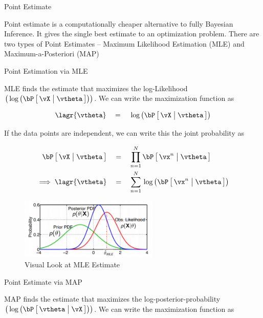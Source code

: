 \documentclass{article}
\begin{document}
\makeheader

\begin{ssection}{Point Estimate}

	Point estimate is a computationally cheaper alternative to fully Bayesian Inference. It gives the single best estimate to an optimization problem. There are two types of Point Estimates -- Maximum Likelihood Estimation (MLE) and Maximum-a-Posteriori (MAP)

	\begin{ssubsection}{Point Estimation via MLE}

		MLE finds the estimate that maximizes the log-Likelihood $\para{\log{\prob{\vX \pipe \vtheta}}}$. We can write the maximization function as

		\begin{align*}
			\lagr{\vtheta}	\eq	\log{\prob{\vX \pipe \vtheta}}
		\end{align*}

		If the data points are independent, we can write this the joint probability as

		\begin{align*}
			\prob{\vX \pipe \vtheta}		&\eq	\prod_{n = 1}^N \prob{\vx^n \pipe \vtheta} \\
			\implies \lagr{\vtheta}	&\eq	\sum_{n = 1}^N \log{\prob{\vx^n \pipe \vtheta}}
		\end{align*}

		\begin{figure}[h!]
			\centering
			\includegraphics[width=250px]{includes/scribe02/mle-estimate.png}
			\caption{Visual Look at MLE Estimate}
		\end{figure}


	\end{ssubsection}

	\begin{ssubsection}{Point Estimate via MAP}

		MAP finds the estimate that maximizes the log-posterior-probability $\para{\log{\prob{\vtheta \pipe \vX}}}$. We can write the maximization function as


\end{ssubsection}
\end{ssection}
\end{document}
